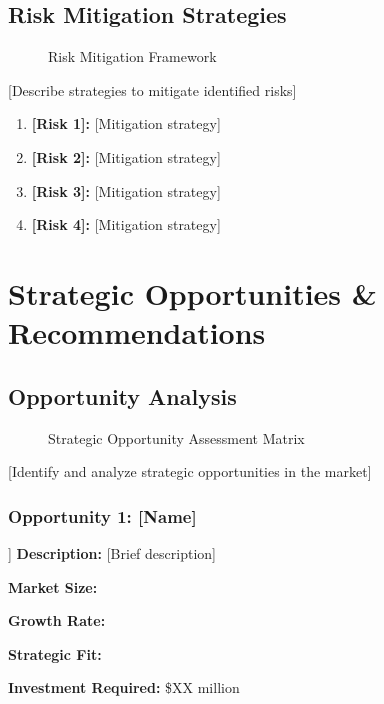 \documentclass[11pt,letterpaper]{report}
\begin{document}
\section{Risk Mitigation Strategies}


\begin{figure}[htbp]
\centering
\caption{Risk Mitigation Framework}
\label{fig:risk_mitigation}
\end{figure}

[Describe strategies to mitigate identified risks]

\begin{riskbox}
\begin{enumerate}
    \item \textbf{[Risk 1]:} [Mitigation strategy]
    \item \textbf{[Risk 2]:} [Mitigation strategy]
    \item \textbf{[Risk 3]:} [Mitigation strategy]
    \item \textbf{[Risk 4]:} [Mitigation strategy]
\end{enumerate}
\end{riskbox}

\chapter{Strategic Opportunities \& Recommendations}

\section{Opportunity Analysis}


\begin{figure}[htbp]
\centering
\caption{Strategic Opportunity Assessment Matrix}
\label{fig:opportunity_matrix}
\end{figure}

[Identify and analyze strategic opportunities in the market]

\subsection{Opportunity 1: [Name]}
\begin{opportunitybox}[Opportunity: [Name]]
\textbf{Description:} [Brief description]

\textbf{Market Size:} 

\textbf{Growth Rate:} 

\textbf{Strategic Fit:} 

\textbf{Investment Required:} \$XX million
\end{opportunitybox}
\end{document}
